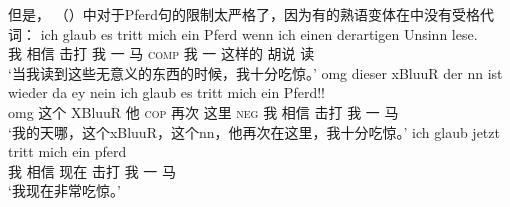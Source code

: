 但是， （）中对于Pferd句的限制太严格了，因为有的熟语变体在\vfc 中没有受格代词：
\eal
\ex 
\gll ich glaub es tritt mich ein Pferd wenn ich einen derartigen Unsinn lese.\footnotemark\\
     我 相信 \expl{} 击打 我 一 马 \textsc{comp} 我 一 这样的 胡说 读\\
\glt `当我读到这些无意义的东西的时候，我十分吃惊。'
\ex 
\gll omg dieser xBluuR der nn ist wieder da ey nein ich glaub es tritt mich ein Pferd!!\footnotemark\\
    omg 这个   XBluuR 他  {} \textsc{cop}  再次 这里 {} \textsc{neg} 我 相信 \expl{} 击打 我 一 马\\
\glt `我的天哪，这个xBluuR，这个nn，他再次在这里，我十分吃惊。'
\ex 
\gll ich glaub jetzt tritt mich ein pferd\footnotemark\\
    我 相信 现在   击打 我 一 马\\
\glt `我现在非常吃惊。'
